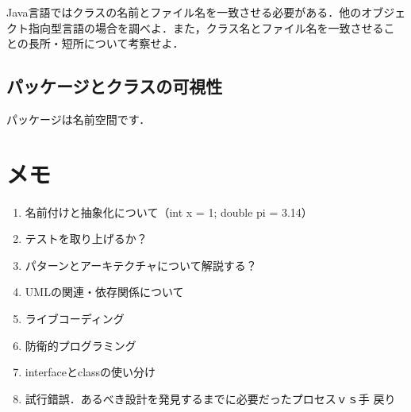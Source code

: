 \documentclass[a4j,papersize]{jsbook}
\begin{document}
\begin{演習}
 Java言語ではクラスの名前とファイル名を一致させる必要がある．他のオブジェ
 クト指向型言語の場合を調べよ．また，クラス名とファイル名を一致させるこ
 との長所・短所について考察せよ．
\end{演習}
 

\section{パッケージとクラスの可視性}
パッケージは名前空間です．

\chapter{メモ}

\begin{enumerate}
 \item 名前付けと抽象化について（int x = 1; double pi = 3.14）
 \item テストを取り上げるか？
 \item パターンとアーキテクチャについて解説する？
 \item UMLの関連・依存関係について
 \item ライブコーディング
 \item 防衛的プログラミング
 \item interfaceとclassの使い分け
 \item 試行錯誤．あるべき設計を発見するまでに必要だったプロセスｖｓ手
       戻り
\end{enumerate}
\end{document}
